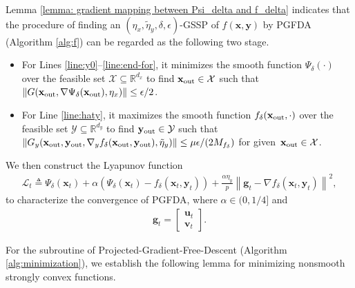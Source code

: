 \documentclass[11pt]{article}
\def\vg{\mathbf{g}}
\def\vu{\mathbf{u}}
\def\vv{\mathbf{v}}
\def\vx{\mathbf{x}}
\def\vy{\mathbf{y}}
\def\fX{{\mathcal{X}}}
\def\fY{{\mathcal{Y}}}
\def\BR{{\mathbb{R}}}
\newcommand{\norm}[1]{\left\| #1 \right\|}
\begin{document}
Lemma \ref{lemma: gradient mapping between Psi_delta and f_delta} indicates that the procedure of finding an $(\eta_x,\tilde\eta_y,\delta,\epsilon)$-GSSP of $f(\vx,\vy)$ 
by PGFDA (Algorithm \ref{alg:f}) can be regarded as the following two stage.
\begin{itemize}[topsep=0.025cm,parsep=0.002cm]
    \item For Lines \ref{line:y0}--\ref{line:end-for}, it minimizes the smooth function $\Psi_\delta(\cdot)$ over the feasible set $\fX\subseteq\BR^{d_x}$ to find $\vx_{\rm out}\in\fX$ such that $\norm{G(\vx_{\rm out},\nabla\Psi_\delta(\vx_{\rm out}),\eta_x)} \leq {\epsilon}/{2}$.
    \item For Line \ref{line:haty}, it maximizes the smooth function $f_\delta(\vx_{\rm out},\cdot)$ over the feasible set $\fY\subseteq\BR^{d_y}$ to find $\vy_{\rm out}\in\fY$ such that 
    $\| G_y(\vx_{\rm out}, \vy_{\rm out},\nabla_y f_\delta(\vx_{\rm out},\vy_{\rm out}),\tilde\eta_y) \| \leq \mu\epsilon/(2M_{f_\delta})$ for given~$\vx_{\rm out}\in\fX$.
\end{itemize}
We then construct the Lyapunov function 
\begin{align}\label{Def of H}
    {\mathcal L}_t \triangleq \Psi_{\delta}(\vx_t)  + \alpha \left( \Psi_{\delta}(\vx_{t}) - f_{\delta}(\vx_{t}, \vy_{t}) \right)+\frac{\alpha\eta_y}{p}\norm{\mathbf{g}_t-\nabla f_\delta(\vx_t,\vy_t)}^2,
\end{align}
to characterize the convergence of PGFDA, where $\alpha\in(0,1/4]$ and 
\begin{align*}
    \vg_t=
\begin{bmatrix}
    \vu_t\\
    \vv_t
\end{bmatrix}.
\end{align*}

For the subroutine of Projected-Gradient-Free-Descent (Algorithm
\ref{alg:minimization}), we establish the following lemma for minimizing nonsmooth strongly convex functions.
\end{document}
